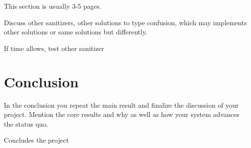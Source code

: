 \documentclass[a4paper,11pt,oneside]{report}
\begin{document}
This section is usually 3-5 pages.

Discuss other sanitizers, other solutions to type confusion,
which may implements other solutions or same solutions but differently.

If time allows, test other sanitizer




\chapter{Conclusion}

In the conclusion you repeat the main result and finalize the discussion of
your project. Mention the core results and why as well as how your system
advances the status quo.

Concludes the project 
\cleardoublepage
{}
{}
\printbibliography

%
%
\end{document}
